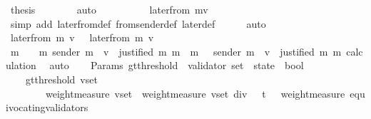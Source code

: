 \begin{isabellebody}
\ {\isacharquery}thesis\isanewline
\ \ \ \ \ \ \isamarkupfalse%
\ auto\isanewline
\ \ \isamarkupfalse%
\isanewline
\ \ \isamarkupfalse%
\ \isamarkupfalse%
\ {\isachardoublequoteopen}{\isasymdots}\ {\isacharequal}\ later{\isacharunderscore}from\ {\isacharparenleft}m{\isacharcomma}v{\isacharcomma}{\isasymsigma}{\isacharprime}{\isacharparenright}{\isachardoublequoteclose}\isanewline
\ \ \ \ \isamarkupfalse%
\ {\isacharparenleft}simp\ add{\isacharcolon}\ later{\isacharunderscore}from{\isacharunderscore}def\ from{\isacharunderscore}sender{\isacharunderscore}def\ later{\isacharunderscore}def{\isacharparenright}\isanewline
\ \ \ \ \isamarkupfalse%
\ auto\isanewline
\ \ \isamarkupfalse%
\ \isamarkupfalse%
\ {\isachardoublequoteopen}later{\isacharunderscore}from\ {\isacharparenleft}m{\isacharcomma}\ v{\isacharcomma}\ {\isasymsigma}{\isacharparenright}\ {\isacharequal}\ later{\isacharunderscore}from\ {\isacharparenleft}m{\isacharcomma}\ v{\isacharcomma}\ {\isasymsigma}{\isacharprime}{\isacharparenright}{\isachardoublequoteclose}\isanewline
\ \ \ \ \isamarkupfalse%
\ {\isacartoucheopen}{\isacharbraceleft}m{\isacharprime}{\isacharprime}\ {\isasymin}\ {\isasymsigma}\ {\isasymunion}\ {\isacharbraceleft}m{\isacharprime}{\isacharbraceright}{\isachardot}\ sender\ m{\isacharprime}{\isacharprime}\ {\isacharequal}\ v\ {\isasymand}\ justified\ m\ m{\isacharprime}{\isacharprime}{\isacharbraceright}\ {\isacharequal}\ {\isacharbraceleft}m{\isacharprime}{\isacharprime}\ {\isasymin}\ {\isasymsigma}{\isacharprime}{\isachardot}\ sender\ m{\isacharprime}{\isacharprime}\ {\isacharequal}\ v\ {\isasymand}\ justified\ m\ m{\isacharprime}{\isacharprime}{\isacharbraceright}{\isacartoucheclose}\ calculation\ \isamarkupfalse%
\ auto\isanewline
{}\isamarkupfalse%
%
\endisatagproof
{\isafoldproof}%
%
\isadelimproof
\isanewline
%
\endisadelimproof
\isanewline
\ \isanewline
{}\isamarkupfalse%
\ {\isacharparenleft}\ Params{\isacharparenright}\ gt{\isacharunderscore}threshold\ {\isacharcolon}{\isacharcolon}\ {\isachardoublequoteopen}{\isacharparenleft}validator\ set\ {\isacharasterisk}\ state{\isacharparenright}\ {\isasymRightarrow}\ bool{\isachardoublequoteclose}\isanewline
\ \ \isanewline
\ \ \ \ {\isachardoublequoteopen}gt{\isacharunderscore}threshold\ {\isacharparenleft}v{\isacharunderscore}set{\isacharcomma}\ {\isasymsigma}{\isacharparenright}\isanewline
\ \ \ \ \ \ \ {\isacharequal}\ {\isacharparenleft}weight{\isacharunderscore}measure\ v{\isacharunderscore}set\ {\isachargreater}\ {\isacharparenleft}weight{\isacharunderscore}measure\ v{\isacharunderscore}set{\isacharparenright}\ div\ {}\ {\isacharplus}\ t\ \ {\isacharminus}\ weight{\isacharunderscore}measure\ {\isacharparenleft}equivocating{\isacharunderscore}validators\ {\isasymsigma}{\isacharparenright}{\isacharparenright}{\isachardoublequoteclose}\isanewline

\end{isabellebody}

